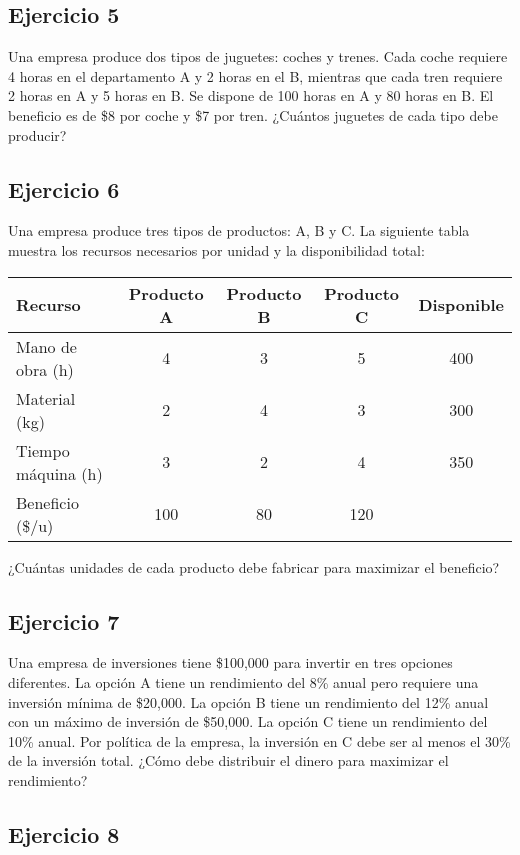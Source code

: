 \documentclass[12pt]{article}
\begin{document}
\subsection*{Ejercicio 5}

Una empresa produce dos tipos de juguetes: coches y trenes. Cada coche requiere 4 horas en el departamento A y 2 horas en el B, mientras que cada tren requiere 2 horas en A y 5 horas en B. Se dispone de 100 horas en A y 80 horas en B. El beneficio es de \$8 por coche y \$7 por tren. ¿Cuántos juguetes de cada tipo debe producir?

\subsection*{Ejercicio 6}

Una empresa produce tres tipos de productos: A, B y C. La siguiente tabla muestra los recursos necesarios por unidad y la disponibilidad total:

\begin{center}
\begin{tabular}{lcccc}
\toprule
Recurso & Producto A & Producto B & Producto C & Disponible \\
\midrule
Mano de obra (h) & 4 & 3 & 5 & 400 \\
Material (kg) & 2 & 4 & 3 & 300 \\
Tiempo máquina (h) & 3 & 2 & 4 & 350 \\
\midrule
Beneficio (\$/u) & 100 & 80 & 120 & \\
\bottomrule
\end{tabular}
\end{center}

¿Cuántas unidades de cada producto debe fabricar para maximizar el beneficio?

\subsection*{Ejercicio 7}

Una empresa de inversiones tiene \$100,000 para invertir en tres opciones diferentes. La opción A tiene un rendimiento del 8\% anual pero requiere una inversión mínima de \$20,000. La opción B tiene un rendimiento del 12\% anual con un máximo de inversión de \$50,000. La opción C tiene un rendimiento del 10\% anual. Por política de la empresa, la inversión en C debe ser al menos el 30\% de la inversión total. ¿Cómo debe distribuir el dinero para maximizar el rendimiento?

\subsection*{Ejercicio 8}
\end{document}
